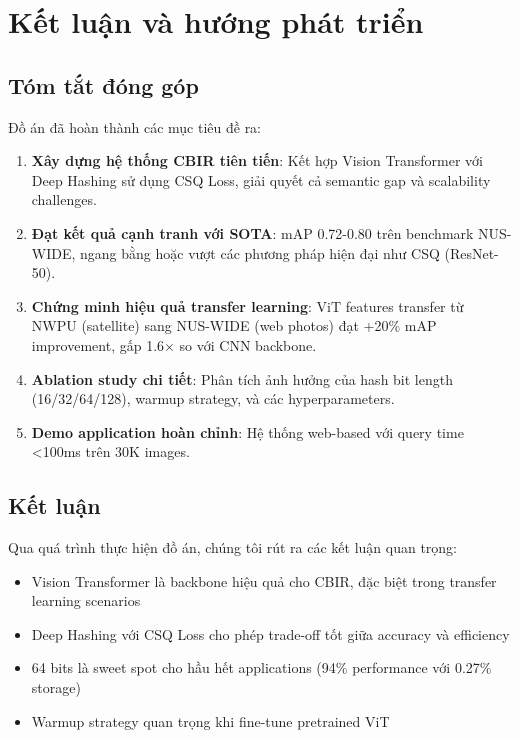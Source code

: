 \documentclass[12pt,a4paper]{article}
\begin{document}
\section{Kết luận và hướng phát triển}

\subsection{Tóm tắt đóng góp}

Đồ án đã hoàn thành các mục tiêu đề ra:

\begin{enumerate}
    \item \textbf{Xây dựng hệ thống CBIR tiên tiến}: Kết hợp Vision Transformer với Deep Hashing sử dụng CSQ Loss, giải quyết cả semantic gap và scalability challenges.
    
    \item \textbf{Đạt kết quả cạnh tranh với SOTA}: mAP 0.72-0.80 trên benchmark NUS-WIDE, ngang bằng hoặc vượt các phương pháp hiện đại như CSQ (ResNet-50).
    
    \item \textbf{Chứng minh hiệu quả transfer learning}: ViT features transfer từ NWPU (satellite) sang NUS-WIDE (web photos) đạt +20\% mAP improvement, gấp 1.6× so với CNN backbone.
    
    \item \textbf{Ablation study chi tiết}: Phân tích ảnh hưởng của hash bit length (16/32/64/128), warmup strategy, và các hyperparameters.
    
    \item \textbf{Demo application hoàn chỉnh}: Hệ thống web-based với query time <100ms trên 30K images.
\end{enumerate}

\subsection{Kết luận}

Qua quá trình thực hiện đồ án, chúng tôi rút ra các kết luận quan trọng:

\begin{itemize}
    \item Vision Transformer là backbone hiệu quả cho CBIR, đặc biệt trong transfer learning scenarios
    \item Deep Hashing với CSQ Loss cho phép trade-off tốt giữa accuracy và efficiency
    \item 64 bits là sweet spot cho hầu hết applications (94\% performance với 0.27\% storage)
    \item Warmup strategy quan trọng khi fine-tune pretrained ViT
\end{itemize}
\end{document}
